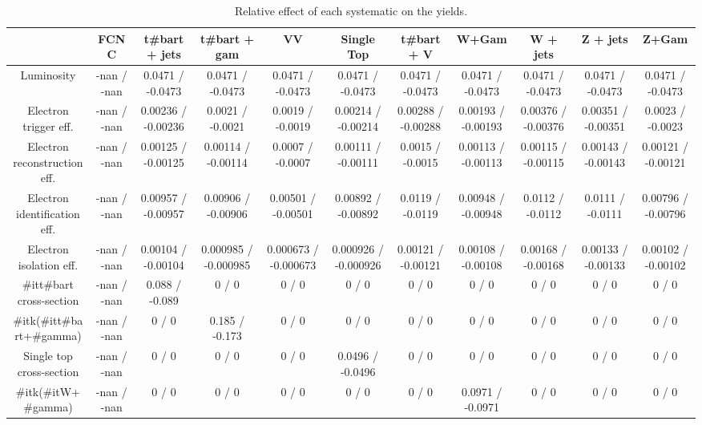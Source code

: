 \begin{table}[htbp]
\begin{center}
\footnotesize
\begin{tabular}{|c|c|c|c|c|c|c|c|c|c|c|}
\hline 
      & FCNC      & t#bar{t} + jets      & t#bar{t} +  gam      & VV      & Single Top      & t#bar{t} + V      & W+Gam      & W + jets      & Z + jets      & Z+Gam \\ 
\hline 
  Luminosity & -nan / -nan & 0.0471 / -0.0473 & 0.0471 / -0.0473 & 0.0471 / -0.0473 & 0.0471 / -0.0473 & 0.0471 / -0.0473 & 0.0471 / -0.0473 & 0.0471 / -0.0473 & 0.0471 / -0.0473 & 0.0471 / -0.0473 \\ 
  Electron trigger eff. & -nan / -nan & 0.00236 / -0.00236 & 0.0021 / -0.0021 & 0.0019 / -0.0019 & 0.00214 / -0.00214 & 0.00288 / -0.00288 & 0.00193 / -0.00193 & 0.00376 / -0.00376 & 0.00351 / -0.00351 & 0.0023 / -0.0023 \\ 
  Electron reconstruction eff. & -nan / -nan & 0.00125 / -0.00125 & 0.00114 / -0.00114 & 0.0007 / -0.0007 & 0.00111 / -0.00111 & 0.0015 / -0.0015 & 0.00113 / -0.00113 & 0.00115 / -0.00115 & 0.00143 / -0.00143 & 0.00121 / -0.00121 \\ 
  Electron identification eff. & -nan / -nan & 0.00957 / -0.00957 & 0.00906 / -0.00906 & 0.00501 / -0.00501 & 0.00892 / -0.00892 & 0.0119 / -0.0119 & 0.00948 / -0.00948 & 0.0112 / -0.0112 & 0.0111 / -0.0111 & 0.00796 / -0.00796 \\ 
  Electron isolation eff. & -nan / -nan & 0.00104 / -0.00104 & 0.000985 / -0.000985 & 0.000673 / -0.000673 & 0.000926 / -0.000926 & 0.00121 / -0.00121 & 0.00108 / -0.00108 & 0.00168 / -0.00168 & 0.00133 / -0.00133 & 0.00102 / -0.00102 \\ 
  #it{t#bar{t}} cross-section & -nan / -nan & 0.088 / -0.089 & 0 / 0 & 0 / 0 & 0 / 0 & 0 / 0 & 0 / 0 & 0 / 0 & 0 / 0 & 0 / 0 \\ 
  #it{k}(#it{t#bar{t}+#gamma}) & -nan / -nan & 0 / 0 & 0.185 / -0.173 & 0 / 0 & 0 / 0 & 0 / 0 & 0 / 0 & 0 / 0 & 0 / 0 & 0 / 0 \\ 
  Single top cross-section & -nan / -nan & 0 / 0 & 0 / 0 & 0 / 0 & 0.0496 / -0.0496 & 0 / 0 & 0 / 0 & 0 / 0 & 0 / 0 & 0 / 0 \\ 
  #it{k}(#it{W+#gamma}) & -nan / -nan & 0 / 0 & 0 / 0 & 0 / 0 & 0 / 0 & 0 / 0 & 0.0971 / -0.0971 & 0 / 0 & 0 / 0 & 0 / 0 \\ 
\hline 
\end{tabular} 
\caption{Relative effect of each systematic on the yields.} 
\end{center} 
\end{table} 
